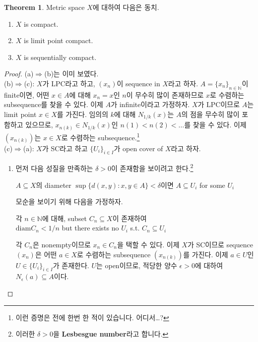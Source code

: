 \documentclass[12pt]{article}
\theoremstyle{definition}
\newtheorem{thm}{Theorem}[section]
\def\NN{\mathbb{N}}
\def\eps{\epsilon}
\begin{document}
	\begin{thm} \label{1.11}
		Metric space \(X\)에 대하여 다음은 동치.
		\begin{enumerate}[label=(\alph*), leftmargin=2\parindent]
			\item
			\(X\) is compact.
			\item
			\(X\) is limit point compact.
			\item
			\(X\) is sequentially compact.
		\end{enumerate}	
	\end{thm}
	\begin{proof}
		(a)$\Rightarrow$(b)는 이미 보였다.\\
		(b)$\Rightarrow$(c): \(X\)가 LPC라고 하고, \((x_n)\)이 sequence in \(X\)라고 하자. \(A = \{x_n\}_{n \in \NN}\)이 finite이면, 어떤 \(x \in A\)에 대해 \(x_n = x\)인 \(n\)이 무수히 많이 존재하므로 \(x\)로 수렴하는 subsequence를 찾을 수 있다. 이제 \(A\)가 infinite이라고 가정하자. \(X\)가 LPC이므로 \(A\)는 limit point \(x \in X\)를 가진다. 임의의 \(k\)에 대해 \(N_{1/k} (x)\)는 \(A\)의 점을 무수히 많이 포함하고 있으므로, \(x_{n(k)} \in N_{1/k} (x)\)인 \(n(1) < n(2) < \ldots\)를 찾을 수 있다. 이제 \((x_{n(k)})\)는 \(x \in X\)로 수렴하는 subsequence.\footnote{이런 증명은 전에 한번 한 적이 있습니다. 어디서\ldots?}\\
		(c)$\Rightarrow$(a): \(X\)가 SC라고 하고 \(\{U_i\}_{i \in I}\)가 open cover of \(X\)라고 하자.
		\begin{enumerate}[label={Step \arabic*}, leftmargin=3\parindent]
			\item
			먼저 다음 성질을 만족하는 \(\delta > 0\)이 존재함을 보이려고 한다.\footnote{이러한 \(\delta > 0\)을 \textbf{Lesbesgue number}라고 합니다.}
			\begin{center}
				\(A \subseteq X\)의 diameter \(\sup \{d(x, y) : x, y \in A\} < \delta\)이면 \(A \subseteq U_i\) for some \(U_i\)
			\end{center}
			모순을 보이기 위해 다음을 가정하자.
			\begin{center}
				각 \(n \in \NN\)에 대해, subset \(C_n \subseteq X\)이 존재하여\\
				\(\mathrm{diam} C_n < 1/n\) but there exists no \(U_i\) s.t. \(C_n \subseteq U_i\)
			\end{center}
			각 \(C_n\)은 nonempty이므로 \(x_n \in C_n\)을 택할 수 있다. 이제 \(X\)가 SC이므로 sequence \((x_n)\)은 어떤 \(a \in X\)로 수렴하는 subsequence \((x_{n(k)})\)를 가진다. 이제 \(a \in U\)인 \(U \in \{U_i\}_{i \in I}\)가 존재한다. \(U\)는 open이므로, 적당한 양수 \(\eps > 0\)에 대하여 \(N_\eps (a) \subseteq A\)이다.\\

\end{enumerate}
\end{proof}
\end{document}
